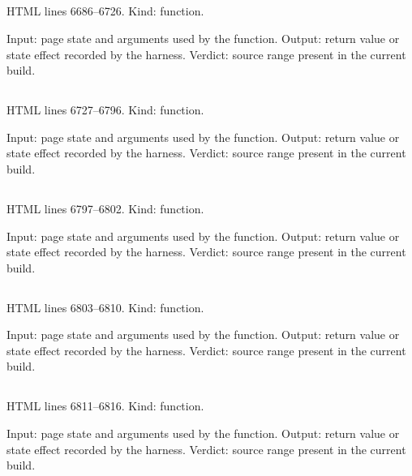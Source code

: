 \subsection*{\texttt{}}
\label{vf_322_renderPanel}
HTML lines 6686--6726. Kind: function.

Input: page state and arguments used by the function.
Output: return value or state effect recorded by the harness.
Verdict: source range present in the current build.

\subsection*{\texttt{}}
\label{vf_323_renderCcDetail}
HTML lines 6727--6796. Kind: function.

Input: page state and arguments used by the function.
Output: return value or state effect recorded by the harness.
Verdict: source range present in the current build.

\subsection*{\texttt{}}
\label{vf_324_ccPng}
HTML lines 6797--6802. Kind: function.

Input: page state and arguments used by the function.
Output: return value or state effect recorded by the harness.
Verdict: source range present in the current build.

\subsection*{\texttt{}}
\label{vf_325_ccChartRows}
HTML lines 6803--6810. Kind: function.

Input: page state and arguments used by the function.
Output: return value or state effect recorded by the harness.
Verdict: source range present in the current build.

\subsection*{\texttt{}}
\label{vf_326_ccSvgToPng}
HTML lines 6811--6816. Kind: function.

Input: page state and arguments used by the function.
Output: return value or state effect recorded by the harness.
Verdict: source range present in the current build.


